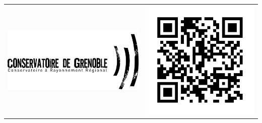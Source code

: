 
\begin{titlepage}
\begin{bigcenter}


\begin{tabular}{lr}
  \begin{minipage}{0.75\linewidth}
    \vspace{0mm}
    \includegraphics[width=0.9\linewidth]{logo_crr.jpg}
  \end{minipage}
  &
  \begin{minipage}{0.25\linewidth}
    \vspace{7mm}
    \includegraphics[width=0.9\linewidth]{qr-cover.pdf}
  \end{minipage}
\end{tabular}


\end{bigcenter}
\end{titlepage}
